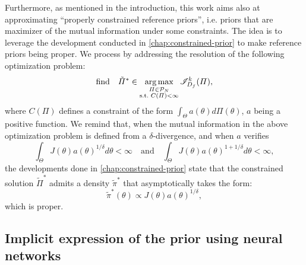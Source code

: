 Furthermore, as mentioned in the introduction, %
this work aims also at approximating ``properly constrained reference priors'', i.e. priors that are maximizer of the mutual information under some constraints. The idea is to leverage the development conducted in \cref{chap:constrained-prior} to make reference priors being proper. We process by 
addressing the resolution of the following optimization problem:
    \begin{equation}\label{eq:VARP:optimproblemintroconstrained}
        \text{find}\quad \tilde\varPi^\ast\in\argmax_{\substack{\varPi\in\cP_N\\ \text{s.t.\ }C(\varPi)<\infty}} \sI^k_{D_f}(\varPi),
    \end{equation}
where $C(\varPi)$ defines a constraint of the form $\int_\Theta a(\theta)d\varPi(\theta)$, $a$ being a positive function. We remind that, when the mutual information in the above optimization problem is defined from a $\delta$-divergence, and when $a$ verifies
\begin{equation}\label{eq:condtitions_a}
    \int_\Theta J(\theta)a(\theta)^{1/\delta}d\theta<\infty\quad \text{and}\quad \int_\Theta J(\theta)a(\theta)^{1+1/\delta}d\theta<\infty,
\end{equation}
the developments done in \cref{chap:constrained-prior} state that the constrained
{solution} $\tilde\varPi^\ast$ %
admits a density $\tilde\pi^\ast$ that asymptotically takes the form:
\begin{equation}
    \tilde\pi^\ast(\theta) \propto J(\theta)a(\theta)^{1/\delta},
\end{equation}
which is proper.





\subsection{Implicit expression of the prior using neural networks}\label{sec:VARP:implicitdef}

